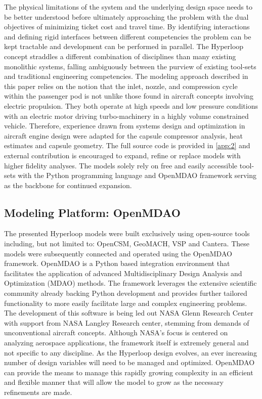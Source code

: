 \documentclass[heading.tex]{subfiles}
\begin{document}
The physical limitations of the system and the underlying design space needs to be better understood before ultimately approaching the
problem with the dual objectives of minimizing ticket cost and travel time. By identifying interactions and defining rigid interfaces between different
competencies the problem can
be kept tractable and development can be performed in parallel. The Hyperloop concept straddles a different combination of disciplines than many
existing monolithic systems, falling ambiguously between the purview of existing tool-sets and traditional engineering competencies. The modeling
approach described in this paper relies on the notion that the inlet, nozzle, and compression cycle within the passenger pod is not unlike those
found in aircraft concepts involving electric propulsion. They both operate at high speeds and low pressure conditions with an electric motor
driving turbo-machinery in a highly volume constrained vehicle. Therefore, experience drawn from systems design and optimization in aircraft engine
design were adapted for the capsule compressor analysis, heat estimates and capsule geometry. The full source code is provided in
 \cref{app:2} and external contribution is encouraged to expand, refine or replace models with higher fidelity analyses. The models solely rely on
free and easily accessible tool-sets with the Python programming language and OpenMDAO framework serving as the backbone for continued expansion.  

\subsection{Modeling Platform: OpenMDAO}
The presented Hyperloop models were built exclusively using open-source tools including, but not limited to: OpenCSM, GeoMACH, VSP and
Cantera. These models were subsequently connected and operated using the OpenMDAO framework. OpenMDAO is a Python based
integration environment that facilitates the application of advanced Multidisciplinary Design Analysis and Optimization (MDAO) methods.
The framework leverages the extensive scientific community already backing Python development and provides further tailored functionality
to more easily facilitate large and complex engineering problems. The development of this software is being led out NASA Glenn Research
Center with support from NASA Langley Research center, stemming from demands of unconventional aircraft concepts. Although NASA's
focus is centered on analyzing aerospace applications, the framework itself is extremely general and not specific to any discipline. As the
Hyperloop design evolves, an ever increasing number of design variables will need to be managed and optimized. OpenMDAO can provide
the means to manage this rapidly growing complexity in an efficient and flexible manner that will allow the model to grow as the necessary
refinements are made.
\end{document}
